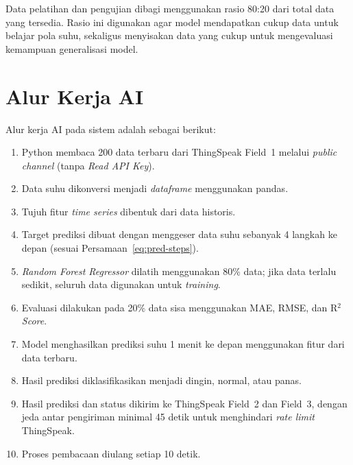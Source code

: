 Data pelatihan dan pengujian dibagi menggunakan rasio 80:20 dari total data
yang tersedia. Rasio ini digunakan agar model mendapatkan cukup data untuk
belajar pola suhu, sekaligus menyisakan data yang cukup untuk mengevaluasi
kemampuan generalisasi model.

\section{Alur Kerja AI}

Alur kerja AI pada sistem adalah sebagai berikut:

\begin{enumerate}
    \item Python membaca 200 data terbaru dari ThingSpeak Field~1 melalui
    \textit{public channel} (tanpa \textit{Read API Key}).
    \item Data suhu dikonversi menjadi \textit{dataframe} menggunakan pandas.
    \item Tujuh fitur \textit{time series} dibentuk dari data historis.
    \item Target prediksi dibuat dengan menggeser data suhu sebanyak 4
    langkah ke depan (sesuai Persamaan~\ref{eq:pred-steps}).
    \item \textit{Random Forest Regressor} dilatih menggunakan 80\% data;
    jika data terlalu sedikit, seluruh data digunakan untuk \textit{training}.
    \item Evaluasi dilakukan pada 20\% data sisa menggunakan MAE, RMSE, dan
    R$^2$ \textit{Score}.
    \item Model menghasilkan prediksi suhu 1 menit ke depan menggunakan
    fitur dari data terbaru.
    \item Hasil prediksi diklasifikasikan menjadi dingin, normal, atau panas.
    \item Hasil prediksi dan status dikirim ke ThingSpeak Field~2 dan Field~3,
    dengan jeda antar pengiriman minimal 45 detik untuk menghindari
    \textit{rate limit} ThingSpeak.
    \item Proses pembacaan diulang setiap 10 detik.
\end{enumerate}

